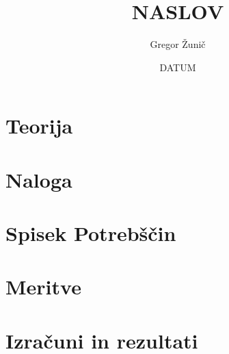\documentclass[12pt,a4paper]{article}
\title{\bf{NASLOV}}
\author{Gregor Žunič}
\date{DATUM}
\begin{document}
\maketitle
\newpage

\tableofcontents

\newpage
\section{Teorija}
\label{sec: teorija}

\newpage
\section{Naloga}
\label{sec: naloga}

\newpage
\section{Spisek Potrebščin}
\label{sec: potrebscine}

\newpage
\section{Meritve}
\label{sec: meritve}

\newpage
\section{Izračuni in rezultati}
\label{sec: rezultati}
\end{document}
